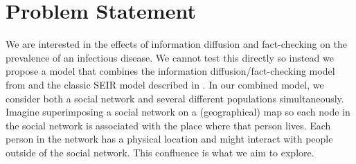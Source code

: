\documentclass[conference]{IEEEtran}
\begin{document}
\section{Problem Statement}
We are interested in the effects of information diffusion and fact-checking on the prevalence of an infectious disease. We cannot test this directly so instead we propose a model that combines the information diffusion/fact-checking model from \cite{Tambuscio15} and the classic SEIR model described in \cite{Montalan19}. In our combined model, we consider both a social network and several different populations simultaneously. Imagine superimposing a social network on a (geographical) map so each node in the social network is associated with the place where that person lives. Each person in the network has a physical location and might interact with people outside of the social network. This confluence is what we aim to explore.
\end{document}
